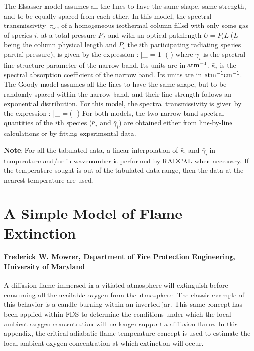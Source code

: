 The Elsasser model assumes all the lines to have the same shape, same strength,
and to be equally spaced from each other. In this model, the spectral
transmissivity, $\bar{\tau}_{\omega}$, of a homogeneous isothermal column filled
with only some gas of species $i$,
at a total pressure $P_T$ and with an optical pathlength $U = P_i L$ ($L$
being the column physical length and $P_i$ the $i$th participating radiating
species partial pressure), is given by the expression \cite{Modest:2003}:
\be\label{eq::Elsasser}
    \bar{\tau}_{\om} = 1- \erf \left(   \right)
\ee
where $\bar{\gamma}_i$ is the spectral fine structure parameter of the narrow
band. Its units are in $\rm atm^{-1}$. $\bar{\kappa}_i$ is the spectral absorption coefficient of the narrow
band. Its units are in $\rm atm^{-1}cm^{-1}$. The Goody model assumes all the lines to have the same shape, but to be randomly
spaced within the narrow band, and their line strength follows an exponential
distribution. For this model, the spectral transmissivity is given by the expression \cite{Modest:2003}:
\be\label{eq::Goody}
    \bar{\tau}_{\om} = \exp\left(- {\displaystyle {}}\right)
\ee
For both models, the two narrow band spectral quantities of the $i$th species ($\bar{\kappa}_i$ and
$\bar{\gamma}_i$) are obtained either from line-by-line calculations or by fitting
experimental data.

\textbf{Note}: For all the tabulated data, a linear interpolation of
$\bar{\kappa}_i$ and $\bar{\gamma}_i$ in temperature and/or in wavenumber is
performed by RADCAL when necessary. If the temperature sought is out of the
tabulated data range, then the data at the nearest temperature are used.


\chapter{A Simple Model of Flame Extinction}
\label{o2_based_model}

\subsubsection*{Frederick W. Mowrer, Department of Fire Protection Engineering, University of Maryland}


A diffusion flame immersed in a vitiated atmosphere will extinguish before consuming all the
available oxygen from the atmosphere.  The classic example of this behavior is a candle burning
within an inverted jar.  This same concept has been applied within FDS
to determine the conditions under which the local ambient oxygen concentration will no longer
support a diffusion flame.  In this appendix, the critical adiabatic flame temperature
concept is used to estimate the local ambient oxygen concentration at which extinction will
occur.

